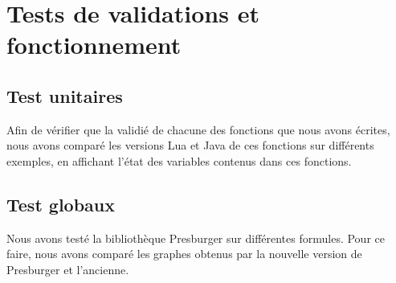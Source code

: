 \section{Tests de validations et fonctionnement}

\subsection{Test unitaires}

Afin de vérifier que la validié de chacune des fonctions que nous avons écrites, nous avons comparé les versions Lua et Java de ces fonctions sur différents exemples, en affichant l'état des variables contenus dans ces fonctions.

\subsection{Test globaux}

Nous avons testé la bibliothèque Presburger sur différentes formules. Pour ce faire, nous avons comparé les graphes obtenus par la nouvelle version de Presburger et l'ancienne.
